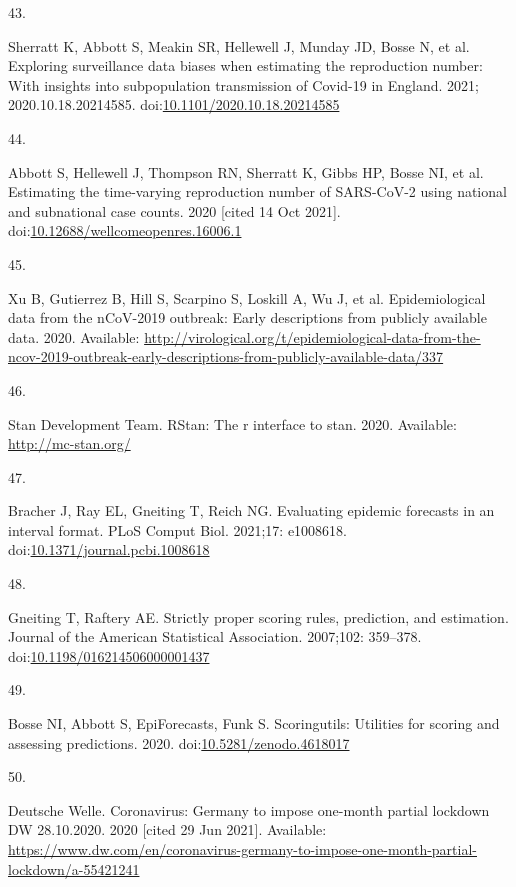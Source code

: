 \documentclass[10pt,letterpaper]{article}
\newlength{\cslhangindent}
\newlength{\csllabelwidth}
\newlength{\cslentryspacingunit} %
\newenvironment{CSLReferences}[2] %
 {%
  \setlength{\parindent}{0pt}
  \ifodd #1
  \let\oldpar\par
  \def\par{\hangindent=\cslhangindent\oldpar}
  \fi
  \setlength{\parskip}{#2\cslentryspacingunit}
 }%
 {}
\newcommand{\CSLLeftMargin}[1]{\parbox[t]{\csllabelwidth}{#1}}
\newcommand{\CSLRightInline}[1]{\parbox[t]{\linewidth - \csllabelwidth}{#1}\break}
\begin{document}
\begin{CSLReferences}{0}{0}
\leavevmode{}%
\CSLLeftMargin{43. }%
\CSLRightInline{Sherratt K, Abbott S, Meakin SR, Hellewell J, Munday JD,
Bosse N, et al. Exploring surveillance data biases when estimating the
reproduction number: With insights into subpopulation transmission of
{Covid-19} in {England}. 2021; 2020.10.18.20214585.
doi:\href{https://doi.org/10.1101/2020.10.18.20214585}{10.1101/2020.10.18.20214585}}

\leavevmode{}%
\CSLLeftMargin{44. }%
\CSLRightInline{Abbott S, Hellewell J, Thompson RN, Sherratt K, Gibbs
HP, Bosse NI, et al. Estimating the time-varying reproduction number of
{SARS-CoV-2} using national and subnational case counts. 2020 {[}cited
14 Oct 2021{]}.
doi:\href{https://doi.org/10.12688/wellcomeopenres.16006.1}{10.12688/wellcomeopenres.16006.1}}

\leavevmode{}%
\CSLLeftMargin{45. }%
\CSLRightInline{Xu B, Gutierrez B, Hill S, Scarpino S, Loskill A, Wu J,
et al. Epidemiological data from the nCoV-2019 outbreak: Early
descriptions from publicly available data. 2020. Available:
\url{http://virological.org/t/epidemiological-data-from-the-ncov-2019-outbreak-early-descriptions-from-publicly-available-data/337}}

\leavevmode{}%
\CSLLeftMargin{46. }%
\CSLRightInline{Stan Development Team. RStan: The r interface to stan.
2020. Available: \url{http://mc-stan.org/}}

\leavevmode{}%
\CSLLeftMargin{47. }%
\CSLRightInline{Bracher J, Ray EL, Gneiting T, Reich NG. Evaluating
epidemic forecasts in an interval format. PLoS Comput Biol. 2021;17:
e1008618.
doi:\href{https://doi.org/10.1371/journal.pcbi.1008618}{10.1371/journal.pcbi.1008618}}

\leavevmode{}%
\CSLLeftMargin{48. }%
\CSLRightInline{Gneiting T, Raftery AE. Strictly proper scoring rules,
prediction, and estimation. Journal of the American Statistical
Association. 2007;102: 359--378.
doi:\href{https://doi.org/10.1198/016214506000001437}{10.1198/016214506000001437}}

\leavevmode{}%
\CSLLeftMargin{49. }%
\CSLRightInline{Bosse NI, Abbott S, EpiForecasts, Funk S. Scoringutils:
Utilities for scoring and assessing predictions. 2020.
doi:\href{https://doi.org/10.5281/zenodo.4618017}{10.5281/zenodo.4618017}}

\leavevmode{}%
\CSLLeftMargin{50. }%
\CSLRightInline{Deutsche Welle. Coronavirus: {Germany} to impose
one-month partial lockdown \textbar{} {DW} \textbar{} 28.10.2020. 2020
{[}cited 29 Jun 2021{]}. Available:
\url{https://www.dw.com/en/coronavirus-germany-to-impose-one-month-partial-lockdown/a-55421241}}

\end{CSLReferences}

\nolinenumbers
\end{document}
